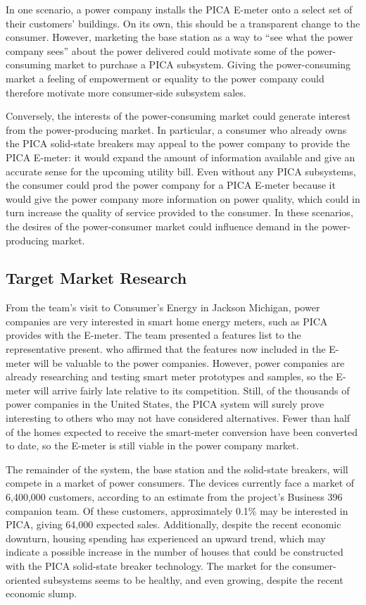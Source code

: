 In one scenario, a power company installs the PICA E-meter onto a select set of their customers' buildings. On its own, this should be a transparent change to the consumer. However, marketing the base station as a way to ``see what the power company sees'' about the power delivered could motivate some of the power-consuming market to purchase a PICA subsystem. Giving the power-consuming market a feeling of empowerment or equality to the power company could therefore motivate more consumer-side subsystem sales.

Conversely, the interests of the power-consuming market could generate interest from the power-producing market. In particular, a consumer who already owns the PICA solid-state breakers may appeal to the power company to provide the PICA E-meter: it would expand the amount of information available and give an accurate sense for the upcoming utility bill. Even without any PICA subsystems, the consumer could prod the power company for a PICA E-meter because it would give the power company more information on power quality, which could in turn increase the quality of service provided to the consumer. In these scenarios, the desires of the power-consumer market could influence demand in the power-producing market.

\subsection{Target Market Research} %
From the team's visit to Consumer's Energy in Jackson Michigan, power companies are very interested in smart home energy meters, such as PICA provides with the E-meter. The team presented a features list to the representative present. who affirmed that the features now included in the E-meter will be valuable to the power companies. However, power companies are already researching and testing smart meter prototypes and samples, so the E-meter will arrive fairly late relative to its competition. Still, of the thousands of power companies in the United States\cite{EIA_Intro}, the PICA system will surely prove interesting to others who may not have considered alternatives. Fewer than half of the homes expected to receive the smart-meter conversion have been converted to date, so the E-meter is still viable in the power company market\cite{Gtech_Smart_Meters}.

The remainder of the system, the base station and the solid-state breakers, will compete in a market of power consumers. The devices currently face a  market of 6,400,000 customers, according to an estimate from the project's Business 396 companion team. Of these customers, approximately 0.1\% may be interested in PICA, giving 64,000 expected sales\cite{Gtech_Renew}. Additionally, despite the recent economic downturn, housing spending has experienced an upward trend\cite{Economic_Predictions}, which may indicate a possible increase in the number of houses that could be constructed with the PICA solid-state breaker technology. The market for the consumer-oriented subsystems seems to be healthy, and even growing, despite the recent economic slump.


